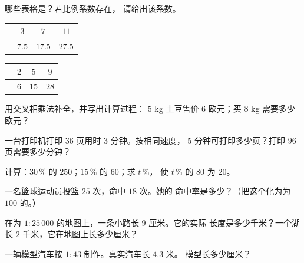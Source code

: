 \begin{exercise}[$\star$]\label{exo:g7:prop:1}
哪些表格是？若比例系数存在，
请给出该系数。
\begin{center}
\renewcommand{\arraystretch}{1.2}
\begin{tabular}{l|ccc}
 & $3$ & $7$ & $11$ \\
\hline
 & $7.5$ & $17.5$ & $27.5$ \\
\end{tabular}
\qquad
\begin{tabular}{l|ccc}
 & $2$ & $5$ & $9$ \\
\hline
 & $6$ & $15$ & $28$ \\
\end{tabular}
\end{center}
\end{exercise}

\begin{exercise}[$\star$]\label{exo:g7:prop:2}
用交叉相乘法补全，并写出计算过程：
$5$ kg 土豆售价 $6$ 欧元；买 $8$ kg 需要多少欧元？
\end{exercise}

\begin{exercise}[$\star$]\label{exo:g7:prop:3}
一台打印机打印 $36$ 页用时 $3$ 分钟。按相同速度，
$5$ 分钟可打印多少页？打印 $96$ 页需要多少分钟？
\end{exercise}

\begin{exercise}[$\star$]\label{exo:g7:prop:4}
计算：$30\,\%$ 的 $250$；\quad $15\,\%$ 的 $60$；\quad 求 $t\,\%$，
使 $t\,\%$ 的 $80$ 为 $20$。
\end{exercise}

\begin{exercise}[$\star$]\label{exo:g7:prop:5}
一名篮球运动员投篮 $25$ 次，命中 $18$ 次。她的
命中率是多少？（把这个化为为 $100$ 的。）
\end{exercise}

\begin{exercise}[$\star$]\label{exo:g7:prop:6}
在为 $1 : 25\,000$ 的地图上，一条小路长 $9$ 厘米。它的实际
长度是多少千米？一个湖长 $2$ 千米，它在地图上长多少厘米？
\end{exercise}

\begin{exercise}[$\star$]\label{exo:g7:prop:7}
一辆模型汽车按 $1 : 43$ 制作。真实汽车长 $4.3$ 米。
模型长多少厘米？
\end{exercise}

